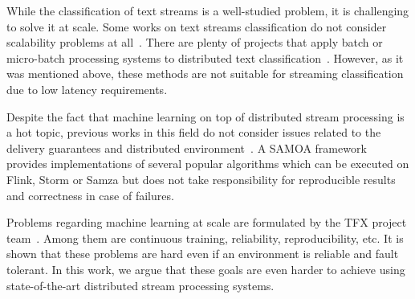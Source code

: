 \label{fs-related}

While the classification of text streams is a well-studied problem, it is challenging to solve it at scale. Some works on text streams classification do not consider scalability problems at all~\cite{zhang2008one}. There are plenty of projects that apply batch or micro-batch processing systems to distributed text classification~\cite{semberecki2016distributed, 8029336, Nodarakis2016LargeSS, baltas2016apache, svyatkovskiy2016large, berral2015aloja}. However, as it was mentioned above, these methods are not suitable for streaming classification due to low latency requirements. 

Despite the fact that machine learning on top of distributed stream processing is a hot topic, previous works in this field do not consider issues related to the delivery guarantees and distributed environment~\cite{khumoyun2016real}. A SAMOA framework~\cite{morales2015samoa} provides implementations of several popular algorithms which can be executed on Flink, Storm or Samza but does not take responsibility for reproducible results and correctness in case of failures.

Problems regarding machine learning at scale are formulated by the TFX project team~\cite{Baylor:2017:TTP:3097983.3098021}. Among them are continuous training, reliability, reproducibility, etc. It is shown that these problems are hard even if an environment is reliable and fault tolerant. In this work, we argue that these goals are even harder to achieve using state-of-the-art distributed stream processing systems.